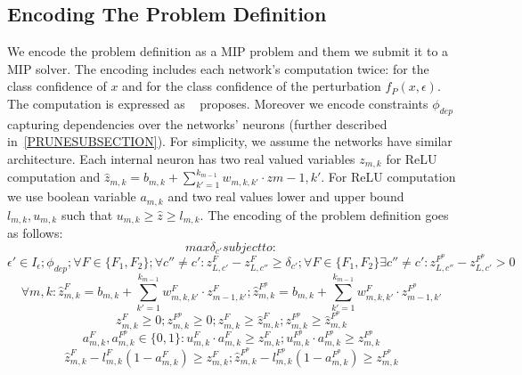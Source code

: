 \subsection{Encoding The Problem Definition}
We encode the problem definition as a MIP problem and them we submit it to a MIP solver. The encoding includes each network's computation twice: for the class confidence of $x$ and for the class confidence of the perturbation $f_P(x,\epsilon)$. The computation is expressed as ~\cite{MIPVERIFY} proposes. Moreover we encode constraints $\phi_{dep}$ capturing dependencies over the networks’ neurons (further described in~\ref{PRUNESUBSECTION}). For simplicity, we assume the networks have similar architecture. Each internal neuron has two real valued variables $z_{m,k}$  for ReLU computation and $\hat{z}_{m,k}=b_{m,k}+\sum_{k'=1}^{k_{m-1}} w_{m,k,k'}\cdot{z{m-1,k'}}$. For ReLU computation we use boolean variable $a_{m,k}$ and two real values lower and upper bound $l_{m,k},u_{m,k}$ such that $u_{m,k}\geq{\hat{z}}\geq{l_{m,k}}$.
The encoding of the problem definition goes as follows:
$$max{\delta_{c'}} subject to:$$
$$ \epsilon'\in{I_\epsilon}; \phi_{dep}; \forall{F}\in{\{F_1,F_2\}}; \forall{c''}\neq{c'}: z^{F}_{L,c'}-z^{F}_{L,c''}\geq\delta_{c'}; \forall{F}\in{\{F_1,F_2\}}\exists{c''}\neq{c'}: z^{F^p}_{L,c''}-z^{F^p}_{L,c'}>0$$
$$\forall{m,k}: \hat{z}^F_{m,k}=b_{m,k}+\sum_{k'=1}^{k_{m-1}} w^F_{m,k,k'}\cdot{z^F_{m-1,k'}}; \hat{z}^{F^p}_{m,k}=b_{m,k}+\sum_{k'=1}^{k_{m-1}} w^F_{m,k,k'}\cdot{z^{F^p}_{m-1,k'}}$$
$$z^F_{m,k}\geq0; z^{F^p}_{m,k}\geq0; z^F_{m,k}\geq{\hat{z}^F_{m,k}}; z^{F^p}_{m,k}\geq{\hat{z}^{F^p}_{m,k}}$$
$$a^F_{m,k},a^{F^p}_{m,k}\in{\{0,1\}}: u^F_{m,k}\cdot{a^F_{m,k}}\geq{z^F_{m,k}}; u^{F^p}_{m,k}\cdot{a^{F^p}_{m,k}}\geq{z^{F^p}_{m,k}}$$
$$\hat{z}^F_{m,k}-l^F_{m,k}(1-a^F_{m,k})\geq{z^F_{m,k}}; \hat{z}^{F^p}_{m,k}-l^{F^p}_{m,k}(1-a^{F^p}_{m,k})\geq{z^{F^p}_{m,k}}$$


